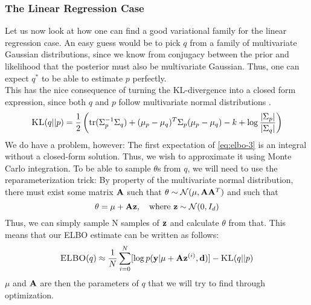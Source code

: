\subsubsection{The Linear Regression Case}
Let us now look at how one can find a good variational family for the linear regression case.
An easy guess would be to pick $q$ from a family of multivariate Gaussian distributions, since we know from conjugacy between the prior and likelihood that the posterior must also be multivariate Gaussian.
Thus, one can expect $q^*$ to be able to estimate $p$ perfectly.\\
This has the nice consequence of turning the KL-divergence into a closed form expression, since both $q$ and $p$ follow multivariate normal distributions \cite{kld-gaussian}.\\
\begin{equation}\textsc{KL}(q || p) = \frac{1}{2}\left(\textrm{tr} (\Sigma_p^{-1}\Sigma_q) + (\mu_p -\mu_q)^T\Sigma_p(\mu_p - \mu_q) - k + \log \frac{|\Sigma_p|}{|\Sigma_q|}\right)\end{equation}
We do have a problem, however: The first expectation of \eqref{eq:elbo-3} is an integral without a closed-form solution.
Thus, we wish to approximate it using Monte Carlo integration. 
To be able to sample $\theta$s from $q$, we will need to use the reparameterization trick:
By property of the multivariate normal distribution, there must exist some matrix $\mathbf{A}$ such that $\theta \sim \mathcal{N}(\mu, \mathbf{A} \mathbf{A}^T)$ \cite{krause22}
and such that
\begin{equation}\theta = \mu + \B{A}\B{z}, \quad \textrm{where}\ \B{z}\sim \mathcal{N}(0,I_d)\end{equation}
Thus, we can simply sample N samples of $\mathbf{z}$ and calculate $\theta$ from that. 
This means that our ELBO estimate can be written as follows:
\begin{equation}\textsc{ELBO}(q) \approx \frac{1}{N}\sum_{i=0}^N [\log p(\mathbf{y} | \mu + \mathbf{A}\mathbf{z}^{(i)}, \mathbf{d})] - \textsc{KL}(q || p)\label{eq:final-elbo}\end{equation}
$\mu$ and $\mathbf{A}$ are then the parameters of $q$ that we will try to find through optimization.

